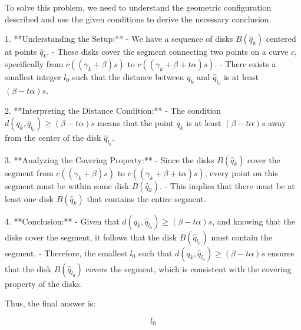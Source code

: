 To solve this problem, we need to understand the geometric configuration described and use the given conditions to derive the necessary conclusion.

1. **Understanding the Setup:**
   - We have a sequence of disks \( B(\hat{q}_k) \) centered at points \( \hat{q}_k \).
   - These disks cover the segment connecting two points on a curve \( c \), specifically from \( c((\gamma_k + \beta)s) \) to \( c((\gamma_k + \beta + t\alpha)s) \).
   - There exists a smallest integer \( l_0 \) such that the distance between \( q_k \) and \( \hat{q}_{l_0} \) is at least \( (\beta - t\alpha)s \).

2. **Interpreting the Distance Condition:**
   - The condition \( d(q_k, \hat{q}_{l_0}) \geq (\beta - t\alpha)s \) means that the point \( q_k \) is at least \( (\beta - t\alpha)s \) away from the center of the disk \( \hat{q}_{l_0} \).

3. **Analyzing the Covering Property:**
   - Since the disks \( B(\hat{q}_k) \) cover the segment from \( c((\gamma_k + \beta)s) \) to \( c((\gamma_k + \beta + t\alpha)s) \), every point on this segment must be within some disk \( B(\hat{q}_k) \).
   - This implies that there must be at least one disk \( B(\hat{q}_k) \) that contains the entire segment.

4. **Conclusion:**
   - Given that \( d(q_k, \hat{q}_{l_0}) \geq (\beta - t\alpha)s \), and knowing that the disks cover the segment, it follows that the disk \( B(\hat{q}_{l_0}) \) must contain the segment.
   - Therefore, the smallest \( l_0 \) such that \( d(q_k, \hat{q}_{l_0}) \geq (\beta - t\alpha)s \) ensures that the disk \( B(\hat{q}_{l_0}) \) covers the segment, which is consistent with the covering property of the disks.

Thus, the final answer is:

\[
\boxed{l_0}
\]